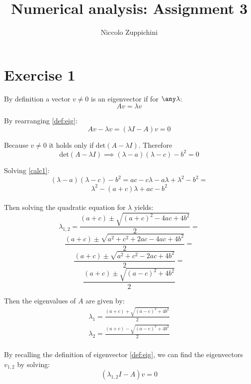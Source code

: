 \documentclass[12pt]{article}
\title{Numerical analysis: Assignment 3}
\author{Niccolo Zuppichini}
\begin{document}
\maketitle
\section*{Exercise 1}

By definition a vector $v \neq 0$ is an eigenvector if for $\any \lambda$: \\

\begin{equation}
	\label{def:eig}
	A v = \lambda v
\end{equation}

By rearranging \ref{def:eig}: \\

$$A v - \lambda v = (\lambda I - A)v = 0 $$

Because $v \neq 0 $ it holds only if $\textrm{det}(A - \lambda I)$. Therefore \\

\begin{equation}
	\label{calc1}
	\textrm{det}(A - \lambda I) \implies (\lambda - a) (\lambda - c) - b^2 = 0
\end{equation}

Solving \ref{calc1}: \\


$$(\lambda - a) (\lambda - c) - b^2 = ac - c \lambda - a \lambda +\lambda^2 -b^2 = $$
$$ \lambda^2 - (a+c) \lambda +ac - b^2$$ \\

Then solving the quadratic equation for $\lambda$ yields: \\

$$ \lambda_{1,2} = \frac{(a+c) \pm \sqrt{(a+c)^2 -4ac + 4b^2}}{2} = $$ 
$$ \frac{(a+c) \pm \sqrt{a^2 + c^2 +2ac -4ac + 4b^2}}{2} = $$
$$ \frac{(a+c) \pm \sqrt{a^2 + c^2 -2ac + 4b^2}}{2} = $$
$$ \frac{(a+c) \pm \sqrt{(a-c)^2+ 4b^2}}{2} $$

Then the eigenvalues of $A$ are given by: \\

\begin{align*}\label{eigenvalues}
\lambda_1 = \frac{(a+c) + \sqrt{(a-c)^2+ 4b^2}}{2} \\
\lambda_2 = \frac{(a+c) - \sqrt{(a-c)^2+ 4b^2}}{2} \\
\end{align*}

By recalling the definition of eigenvector \ref{def:eig}, we can find the eigenvectors $v_{1,2}$ by solving:  \\
\begin{equation}
	\label{eq:eig}
	(\lambda_{1,2} I - A)v = 0 
\end{equation}
\end{document}
